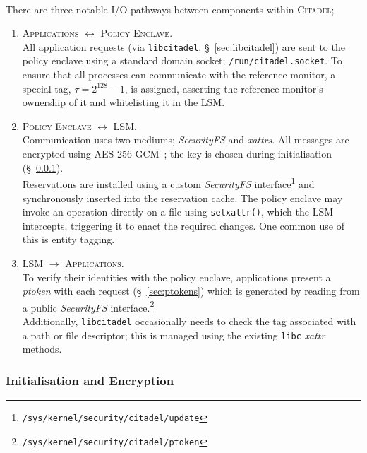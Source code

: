 \paragraph{} There are three notable I/O pathways between components within \textsc{Citadel};
\begin{enumerate}
    \item \textsc{Applications $\longleftrightarrow$ Policy Enclave}. \\
    All application requests (via \texttt{libcitadel}, §~\ref{sec:libcitadel}) are sent to the policy enclave using a standard domain socket; \texttt{/run/citadel.socket}. To ensure that all processes can communicate with the reference monitor, a special tag, $\tau = 2^{128} -1$, is assigned, asserting the reference monitor's ownership of it and whitelisting it in the LSM.
    \item \textsc{Policy Enclave $\longleftrightarrow$ LSM}. \\
    Communication uses two mediums; \textit{SecurityFS} and \textit{xattrs}. All messages are encrypted using AES-256-GCM~\cite{Rijndael,McGrew2005TheGM}; the key is chosen during initialisation (§~\ref{sec:initialisation}). \\
    Reservations are installed using a custom \textit{SecurityFS} interface\footnote{\texttt{/sys/kernel/security/citadel/update}} and synchronously inserted into the reservation cache. The policy enclave may invoke an operation directly on a file using \texttt{setxattr()}, which the LSM intercepts, triggering it to enact the required changes. One common use of this is entity tagging.
    \item \textsc{LSM $\longrightarrow$ Applications}. \\
    To verify their identities with the policy enclave, applications present a \textit{ptoken} with each request (§~\ref{sec:ptokens}) which is generated by reading from a public \textit{SecurityFS} interface.\footnote{\texttt{/sys/kernel/security/citadel/ptoken}} \\
    Additionally, \texttt{libcitadel} occasionally needs to check the tag associated with a path or file descriptor; this is managed using the existing \texttt{libc} \textit{xattr} methods.
\end{enumerate}

\subsubsection{Initialisation and Encryption}
\label{sec:initialisation}
